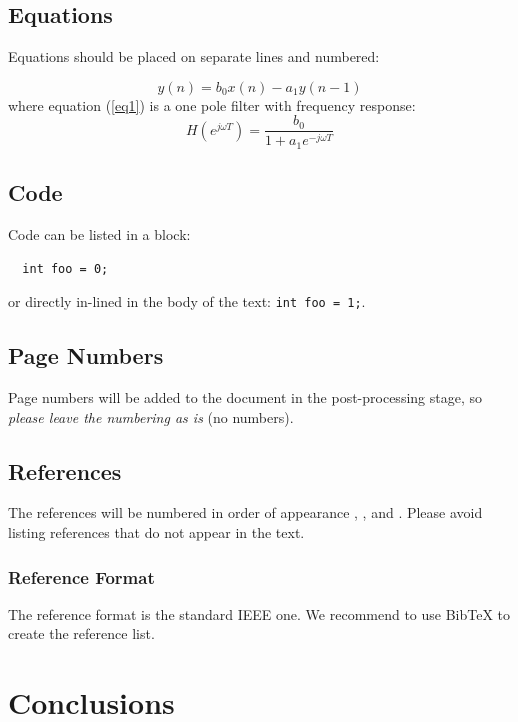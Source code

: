 \documentclass[a4paper]{article}
\begin{document}
\subsection{Equations}

Equations should be placed on separate lines and numbered:

\begin{equation}
	y(n)=b_0x(n)-a_1y(n-1)
	\label{eq1}
	\end{equation}
	where equation (\ref{eq1}) is a one pole filter with frequency response:
	\begin{equation}
	H(e^{j \omega T}) = \frac{b_0}{1+a_1e^{-j \omega T}}
	\label{eq2}
\end{equation}

\subsection{Code}

Code can be listed in a block:

\begin{lstlisting}
  int foo = 0;
\end{lstlisting}
\noindent
or directly in-lined in the body of the text: \lstinline{int foo = 1;}.

\subsection{Page Numbers}

Page numbers will be added to the document in the post-processing stage, so
{\em please leave the numbering as is} (no numbers).


\subsection{References}

The references will be numbered in order of appearance \cite{Sal89},
\cite{Spa72}, \cite{MosWal64} and \cite{Kay86}. Please avoid listing
references that do not appear in the text.

\subsubsection{Reference Format}

The reference format is the standard IEEE one. We recommend to use BibTeX to
create the reference list.

\section{Conclusions}
\end{document}
